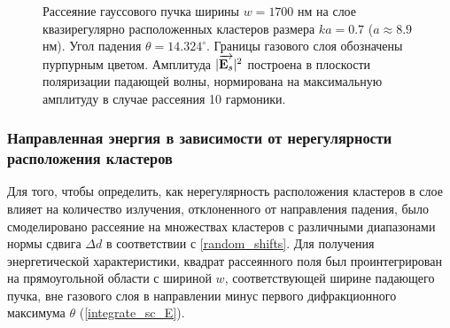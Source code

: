     \begin{figure}[ht]
        \hfil
        \caption{Рассеяние гауссового пучка ширины $w = 1700$ нм на слое квазирегулярно расположенных кластеров размера $ka = 0.7$ ($a \approx 8.9$ нм). Угол падения $\theta = 14.324^{\circ}$. Границы газового слоя обозначены пурпурным цветом. Амплитуда $|\overrightarrow{\textbf{E}_{s}}|^2$ построена в плоскости поляризации падающей волны, нормирована на максимальную амплитуду в случае рассеяния 10 гармоники.}\label{random_ka0.7:image}
    \end{figure}



\subsubsection{Направленная энергия в зависимости от нерегулярности расположения кластеров}

Для того, чтобы определить, как нерегулярность расположения кластеров в слое влияет на количество излучения, отклоненного от направления падения, было смоделировано рассеяние на множествах кластеров с различными диапазонами нормы сдвига $\Delta d$ в соответствии с \autoref{random_shifts}. Для получения энергетической характеристики, квадрат рассеянного поля был проинтегрирован на прямоугольной области с шириной $w$, соответствующей ширине падающего пучка, вне газового слоя в направлении минус первого дифракционного максимума $\theta$ (\autoref{integrate_sc_E}).

